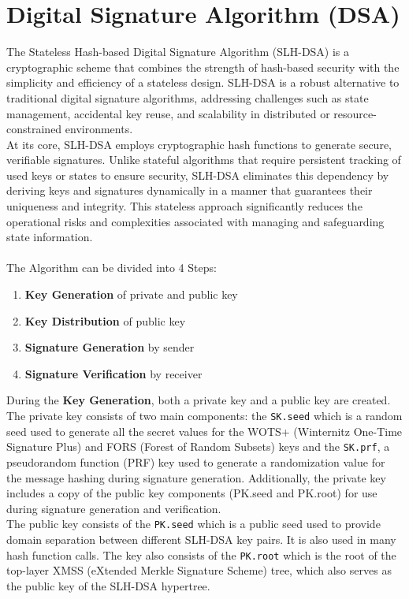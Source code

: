 \documentclass[journal=tosc,notanonymous]{iacrtrans}
\begin{document}
\section{Digital Signature Algorithm (DSA)}
The Stateless Hash-based Digital Signature Algorithm (SLH-DSA) is a cryptographic scheme that combines the strength of hash-based security with the simplicity and efficiency of a stateless design. SLH-DSA is a robust alternative to traditional digital signature algorithms, addressing challenges such as state management, accidental key reuse, and scalability in distributed or resource-constrained environments.
\\
At its core, SLH-DSA employs cryptographic hash functions to generate secure, verifiable signatures. Unlike stateful algorithms that require persistent tracking of used keys or states to ensure security, SLH-DSA eliminates this dependency by deriving keys and signatures dynamically in a manner that guarantees their uniqueness and integrity. This stateless approach significantly reduces the operational risks and complexities associated with managing and safeguarding state information.\\
\\
The Algorithm can be divided into 4 Steps:
\begin{enumerate}
	\item \textbf{Key Generation} of private and public key
	\item \textbf{Key Distribution} of public key
	\item \textbf{Signature Generation} by sender
	\item \textbf{Signature Verification} by receiver
\end{enumerate}
During the \textbf{Key Generation}, both a private key and a public key are created. The private key consists of two main components:
the \texttt{SK.seed} which is a random seed used to generate all the secret values for the WOTS+ (Winternitz One-Time Signature Plus) and FORS (Forest of Random Subsets) keys and the \texttt{SK.prf}, a pseudorandom function (PRF) key used to generate a randomization value for the message hashing during signature generation.
Additionally, the private key includes a copy of the public key components (PK.seed and PK.root) for use during signature generation and verification.
\\
The public key consists of the \texttt{PK.seed} which is a public seed used to provide domain separation between different SLH-DSA key pairs. It is also used in many hash function calls. The key also consists of the \texttt{PK.root} which is the root of the top-layer XMSS (eXtended Merkle Signature Scheme) tree, which also serves as the public key of the SLH-DSA hypertree.
\end{document}
